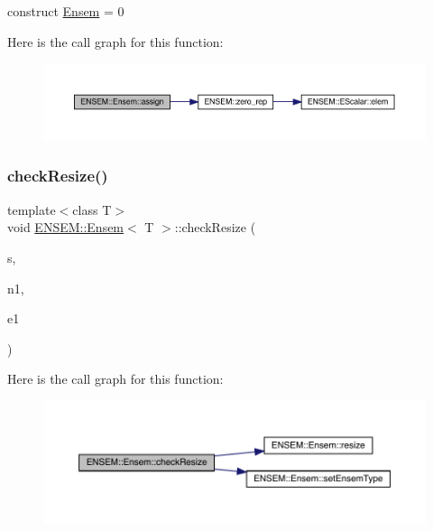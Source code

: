 construct \mbox{\hyperlink{classENSEM_1_1Ensem}{Ensem}} = 0 

Here is the call graph for this function\+:
\nopagebreak
\begin{figure}[H]
\begin{center}
\leavevmode
\includegraphics[width=350pt]{d7/d3e/classENSEM_1_1Ensem_a140d8bb94d07a0abfb2ad396df63c625_cgraph}
\end{center}
\end{figure}
\mbox{\label{classENSEM_1_1Ensem_a1cebe5f8cc3d849d6b4dc7d9d10c636b}} 
\subsubsection{\texorpdfstring{checkResize()}{checkResize()}\hspace{0.1cm}{\footnotesize\ttfamily [1/6]}}
{\footnotesize\ttfamily template$<$class T$>$ \\
void \mbox{\hyperlink{classENSEM_1_1Ensem}{E\+N\+S\+E\+M\+::\+Ensem}}$<$ T $>$\+::check\+Resize (\begin{DoxyParamCaption}\item[{const char $\ast$}]{s,  }\item[{int}]{n1,  }\item[{\mbox{\hyperlink{namespaceENSEM_a2dc2c4a26884f343471e52f23479ddbe}{Ensem\+Type\+\_\+t}}}]{e1 }\end{DoxyParamCaption})\hspace{0.3cm}{\ttfamily [inline]}}

Here is the call graph for this function\+:
\nopagebreak
\begin{figure}[H]
\begin{center}
\leavevmode
\includegraphics[width=350pt]{d7/d3e/classENSEM_1_1Ensem_a1cebe5f8cc3d849d6b4dc7d9d10c636b_cgraph}
\end{center}
\end{figure}
\mbox{\label{classENSEM_1_1Ensem_a1cebe5f8cc3d849d6b4dc7d9d10c636b}} 
